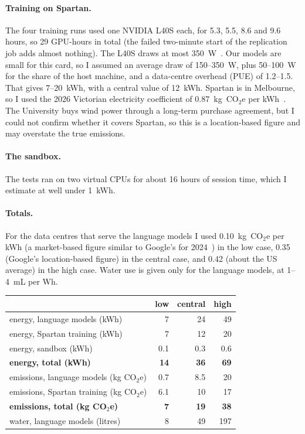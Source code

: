 \documentclass[11pt,a4paper]{article}
\begin{document}
\paragraph{Training on Spartan.} The four training runs used one NVIDIA L40S each, for 5.3, 5.5, 8.6 and 9.6 hours, so 29 GPU-hours in total (the failed two-minute start of the replication job adds almost nothing). The L40S draws at most 350~W~\cite{l40s}. Our models are small for this card, so I assumed an average draw of 150--350~W, plus 50--100~W for the share of the host machine, and a data-centre overhead (PUE) of 1.2--1.5. That gives 7--20~kWh, with a central value of 12~kWh. Spartan is in Melbourne, so I used the 2026 Victorian electricity coefficient of 0.87~kg~CO$_2$e per kWh~\cite{esc}. The University buys wind power through a long-term purchase agreement, but I could not confirm whether it covers Spartan, so this is a location-based figure and may overstate the true emissions.

\paragraph{The sandbox.} The tests ran on two virtual CPUs for about 16 hours of session time, which I estimate at well under 1~kWh.

\paragraph{Totals.} For the data centres that serve the language models I used 0.10~kg~CO$_2$e per kWh (a market-based figure similar to Google's for 2024~\cite{google}) in the low case, 0.35 (Google's location-based figure) in the central case, and 0.42 (about the US average) in the high case. Water use is given only for the language models, at 1--4~mL per Wh.

\begin{center}
\small
\begin{tabular}{lrrr}
\toprule
 & low & central & high\\
\midrule
energy, language models (kWh) & 7 & 24 & 49\\
energy, Spartan training (kWh) & 7 & 12 & 20\\
energy, sandbox (kWh) & 0.1 & 0.3 & 0.6\\
\textbf{energy, total (kWh)} & \textbf{14} & \textbf{36} & \textbf{69}\\
\midrule
emissions, language models (kg CO$_2$e) & 0.7 & 8.5 & 20\\
emissions, Spartan training (kg CO$_2$e) & 6.1 & 10 & 17\\
\textbf{emissions, total (kg CO$_2$e)} & \textbf{7} & \textbf{19} & \textbf{38}\\
\midrule
water, language models (litres) & 8 & 49 & 197\\
\bottomrule
\end{tabular}
\end{center}
\end{document}
